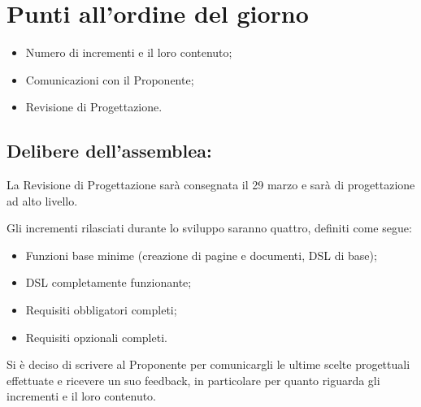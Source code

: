 \newpage
\section{Punti all'ordine del giorno}
\label{2}

\begin{itemize}
\item Numero di incrementi e il loro contenuto;
\item Comunicazioni con il Proponente;
\item Revisione di Progettazione.
\end{itemize}


\subsection{Delibere dell'assemblea:}
La Revisione di Progettazione sar\`{a} consegnata il 29 marzo e sarà di progettazione ad alto livello.

Gli incrementi rilasciati durante lo sviluppo saranno quattro, definiti come segue:

\begin{itemize}
\item Funzioni base minime (creazione di pagine e documenti, DSL di base);
\item DSL completamente funzionante;
\item Requisiti obbligatori completi;
\item Requisiti opzionali completi.
\end{itemize}

Si è deciso di scrivere al Proponente per comunicargli le ultime scelte progettuali effettuate e ricevere un suo feedback, in particolare per quanto riguarda gli incrementi e il loro contenuto.




